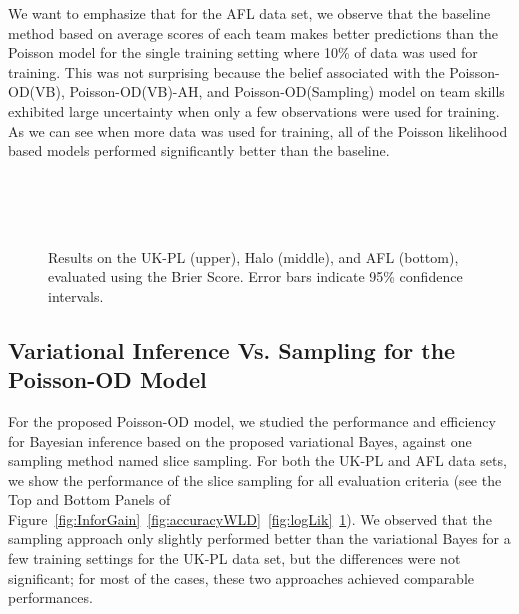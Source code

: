 We want to emphasize that for the AFL data set, we observe that the baseline method based on average scores of each team makes better predictions than the Poisson model for the single training setting where 10\% of data was used for training. This was not surprising because the belief associated with the Poisson-OD(VB), Poisson-OD(VB)-AH, and Poisson-OD(Sampling) model on team skills exhibited large uncertainty when only a few observations were used for training. As we can see when more data was used for training, all of the Poisson likelihood based models performed significantly better than the baseline. 

\begin{center}
\begin{figure}[htbp!]
 \centering
 \\
\\
\\
\caption{\small Results on the UK-PL (upper), Halo (middle), and AFL (bottom), evaluated
using the Brier Score. Error bars indicate
95\% confidence intervals.}
\label{fig:ScoreError}
\end{figure}
\end{center}

\subsection{Variational Inference Vs. Sampling for the Poisson-OD Model}
\label{sec:VBSampling}
For the proposed Poisson-OD model, we studied the performance and efficiency for Bayesian inference based on the proposed variational Bayes, against one sampling method named slice sampling. For both the UK-PL and AFL data sets, we show the performance of the slice sampling for all evaluation criteria (see the Top and Bottom Panels of Figure~\ref{fig:InforGain}~\ref{fig:accuracyWLD}~\ref{fig:logLik}~\ref{fig:ScoreError}). We observed that the sampling approach only slightly performed better than the variational Bayes for a few training settings for the UK-PL data set, but the differences were not significant; for  most of the cases, these two approaches achieved comparable performances. 

